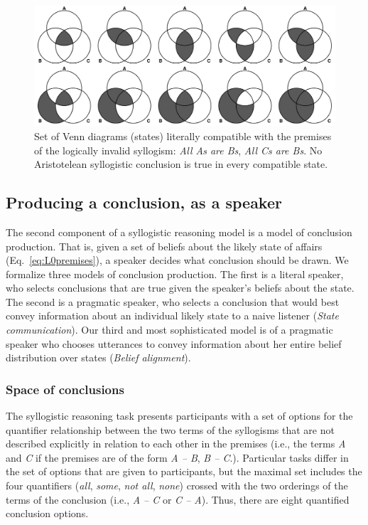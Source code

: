 \documentclass[floatsintext, man]{apa6}
\begin{document}
\begin{figure}[t]
\centering
\includegraphics[width = \textwidth]{diagrams_allAB_allCB.pdf}
\caption{Set of Venn diagrams (states) literally compatible with the premises of the logically invalid syllogism: \emph{All As are Bs}, \emph{All Cs are Bs}. No Aristotelean syllogistic conclusion is true in every compatible state.}
\label{fig:EIvenns}
\end{figure}




\subsection{Producing a conclusion, as a speaker}

The second component of a syllogistic reasoning model is a model of conclusion production. 
That is, given a set of beliefs about the likely state of affairs (Eq.~\ref{eq:L0premises}), a speaker decides what conclusion should be drawn.
We formalize three models of conclusion production.
The first is a literal speaker, who selects conclusions that are true given the speaker's beliefs about the state. 
The second is a pragmatic speaker, who selects a conclusion that would best convey information about an individual likely state to a naive listener (\emph{State communication}). 
Our third and most sophisticated model is of a pragmatic speaker who chooses utterances to convey information about her entire belief distribution over states (\emph{Belief alignment}). 


\subsubsection{Space of conclusions}

The syllogistic reasoning task presents participants with a set of options for the quantifier relationship between the two terms of the syllogisms that are not described explicitly in relation to each other in the premises (i.e., the terms \emph{A} and \emph{C} if the premises are of the form \emph{A -- B}, \emph{B -- C}.). 
Particular tasks differ in the set of options that are given to participants, but the maximal set includes the four quantifiers  (\emph{all}, \emph{some}, \emph{not all}, \emph{none}) crossed with the two orderings of the terms of the conclusion (i.e., \emph{A -- C} or \emph{C -- A}).
Thus, there are eight quantified conclusion options. 
\end{document}
